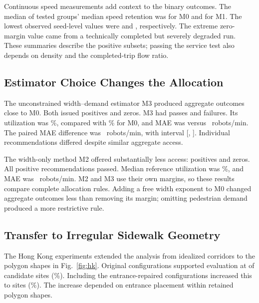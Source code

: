 \documentclass[NewProceedings,letterpaper]{ascelike-new}
\begin{document}
Continuous speed measurements add context to the binary outcomes. The median of tested groups' median speed retention was \ContinuousMZeroMedianSpeed{} for M0 and \ContinuousMOneMedianSpeed{} for M1. The lowest observed seed-level values were \ContinuousMZeroWorst{} and \ContinuousMOneWorst{}, respectively. The extreme zero-margin value came from a technically completed but severely degraded run. These summaries describe the positive subsets; passing the service test also depends on density and the completed-trip flow ratio.

\subsection{Estimator Choice Changes the Allocation}
The unconstrained width--demand estimator M3 produced aggregate outcomes close to M0. Both issued \MThreePositive{} positives and \MThreeZero{} zeros. M3 had \MThreePass{} passes and \MThreeFail{} failures. Its utilization was \MThreeUtil{}\%, compared with \MZeroUtil{}\% for M0, and MAE was \MThreeMAE{} versus \MZeroMAE{}~robots/min. The paired MAE difference was \MAEDifference{}~robots/min, with interval [\MAEDifferenceLow{}, \MAEDifferenceHigh{}]. Individual recommendations differed despite similar aggregate access.

The width-only method M2 offered substantially less access: \MTwoPositive{} positives and \MTwoZero{} zeros. All positive recommendations passed. Median reference utilization was \MTwoUtil{}\%, and MAE was \MTwoMAE{}~robots/min. M2 and M3 use their own margins, so these results compare complete allocation rules. Adding a free width exponent to M0 changed aggregate outcomes less than removing its margin; omitting pedestrian demand produced a more restrictive rule.

\subsection{Transfer to Irregular Sidewalk Geometry}
The Hong Kong experiments extended the analysis from idealized corridors to the polygon shapes in Fig.~\ref{fig:hk}. Original configurations supported evaluation at \HKOriginalN{} of \HKCandidates{} candidate sites (\HKOriginalCoverage{}\%). Including the \HKRepairedN{} entrance-repaired configurations increased this to \HKTotalN{} sites (\HKCoverage{}\%). The increase depended on entrance placement within retained polygon shapes.
\end{document}
